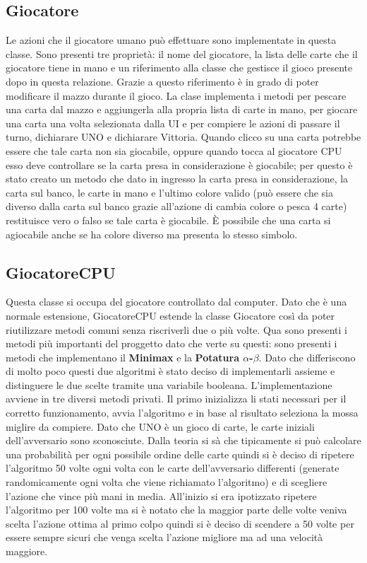 	\subsection{Giocatore}
		Le azioni che il giocatore umano può effettuare sono implementate in questa classe. Sono presenti tre proprietà: il nome del giocatore, la lista delle carte che il giocatore tiene in mano e un riferimento alla classe che gestisce il gioco presente dopo in questa relazione. Grazie a questo riferimento è in grado di poter modificare il mazzo durante il gioco. La clase implementa i metodi per pescare una carta dal mazzo e aggiungerla alla propria lista di carte in mano, per giocare una carta una volta selezionata dalla UI e per compiere le azioni di passare il turno, dichiarare UNO e dichiarare Vittoria. Quando clicco su una carta potrebbe essere che tale carta non sia giocabile, oppure quando tocca al giocatore CPU esso deve controllare se la carta presa in considerazione è giocabile; per questo è stato creato un metodo che dato in ingresso la carta presa in considerazione, la carta sul banco, le carte in mano e l'ultimo colore valido (può essere che sia diverso dalla carta sul banco grazie all'azione di cambia colore o pesca 4 carte) restituisce vero o falso se tale carta è giocabile. È possibile che una carta si agiocabile anche se ha colore diverso ma presenta lo stesso simbolo.
		
	\subsection{GiocatoreCPU}	
		Questa classe si occupa del giocatore controllato dal computer. Dato che è una normale estensione, GiocatoreCPU estende la classe Giocatore così da poter riutilizzare metodi comuni senza riscriverli due o più volte. Qua sono presenti i metodi più importanti del proggetto dato che verte su questi: sono presenti i metodi che implementano il \textbf{Minimax} e la \textbf{Potatura $\alpha$-$\beta$}. Dato che differiscono di molto poco questi due algoritmi è stato deciso di implementarli assieme e distinguere le due scelte tramite una variabile booleana. L'implementazione avviene in tre diversi metodi privati. Il primo inizializza li stati necessari per il corretto funzionamento, avvia l'algoritmo e in base al risultato seleziona la mossa miglire da compiere. Dato che UNO è un gioco di carte, le carte iniziali dell'avversario sono sconosciute. Dalla teoria si sà che tipicamente si può calcolare una probabilità per ogni possibile ordine delle carte quindi si è deciso di ripetere l'algoritmo 50 volte ogni volta con le carte dell'avversario differenti (generate randomicamente ogni volta che viene richiamato l'algoritmo) e di scegliere l'azione che vince più mani in media. All'inizio si era ipotizzato ripetere l'algoritmo per 100 volte ma si è notato che la maggior parte delle volte veniva scelta l'azione ottima al primo colpo quindi si è deciso di scendere a 50 volte per essere sempre sicuri che venga scelta l'azione migliore ma ad una velocità maggiore. \\
		
